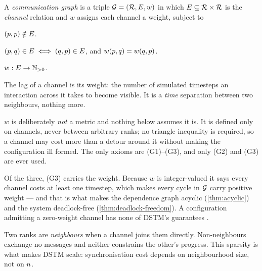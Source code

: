 \begin{definition}\label{def:comm-graph}
A \emph{communication graph} is a triple $\mathcal{G} = (\mathcal{R}, E, w)$ in
which $E \subseteq \mathcal{R} \times \mathcal{R}$ is the \emph{channel} relation
and $w$ assigns each channel a weight, subject to
\begin{description}[leftmargin=2.9cm,style=nextline,font=\normalfont\bfseries]
  \item[\textnormal{(G1) Irreflexivity}] $(p,p) \notin E$.
  \item[\textnormal{(G2) Symmetry}] $(p,q) \in E \iff (q,p) \in E$,
    and $w(p,q) = w(q,p)$. 
  \item[\textnormal{(G3) Positive integer weights}]
    $w : E \to \mathbb{N}_{>0}$. 
\end{description}
\end{definition}

The lag of a channel is its weight: the number of simulated timesteps an
interaction across it takes to become visible. It is a \emph{time} separation
between two neighbours, nothing more.

\begin{convention}\label{conv:lag-not-metric}
$w$ is deliberately \emph{not} a metric and nothing below assumes it is. It is
defined only on channels, never between arbitrary ranks; no triangle
inequality is required, so a channel may cost more than a detour around it
without making the configuration ill formed. The only axioms are (G1)--(G3),
and only (G2) and (G3) are ever used.
\end{convention}

Of the three, (G3) carries the weight. Because $w$ is integer-valued it says
every channel costs at least one timestep, which makes every cycle in
$\mathcal{G}$ carry positive weight --- and that is what makes the dependence
graph acyclic (\cref{thm:acyclic}) and the system deadlock-free
(\cref{thm:deadlock-freedom}). A configuration admitting a zero-weight channel
has none of DSTM's guarantees .

Two ranks are \emph{neighbours} when a channel joins them directly.
Non-neighbours exchange no messages and neither constrains the other's
progress. This sparsity is what makes DSTM scale: synchronisation cost depends
on neighbourhood size, not on $n$.


